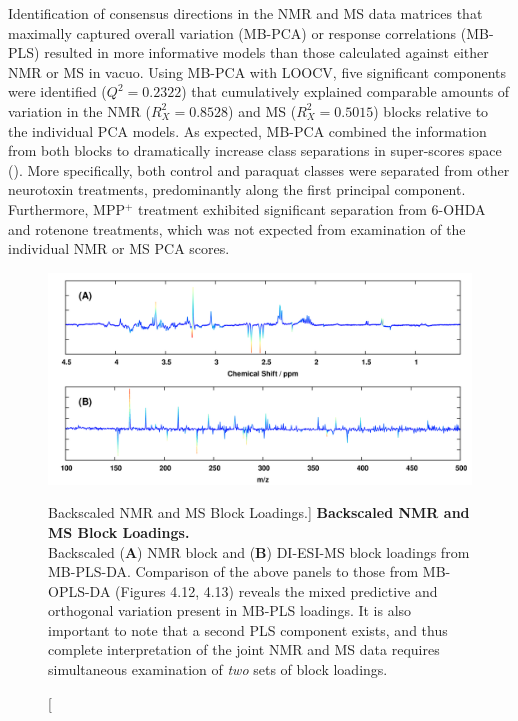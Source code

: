 \begin{doublespace}
Identification of consensus directions in the NMR and MS data matrices that
maximally captured overall variation (MB-PCA) or response correlations (MB-PLS)
resulted in more informative models than those calculated against either NMR
or MS in vacuo. Using MB-PCA with LOOCV, five significant components were
identified ($Q^2 = 0.2322$) that cumulatively explained comparable amounts
of variation in the NMR ($R^2_X = 0.8528$) and MS ($R^2_X = 0.5015$) blocks
relative to the individual PCA models. As expected, MB-PCA combined the
information from both blocks to dramatically increase class separations in
super-scores space (). More specifically, both
control and paraquat classes were separated from other neurotoxin treatments,
predominantly along the first principal component. Furthermore, MPP$^+$
treatment exhibited significant separation from 6-OHDA and rotenone
treatments, which was not expected from examination of the individual
NMR or MS PCA scores.
\end{doublespace}

\begin{figure}[ht!]
\includegraphics[width=6in]{figs/apps/11-mbpls-p.png}
\caption
      [Backscaled NMR and MS Block Loadings.]{
  {\bf Backscaled NMR and MS Block Loadings.}
  \\
  Backscaled ({\bf A}) \hnmr{} NMR block and ({\bf B}) DI-ESI-MS block loadings
  from MB-PLS-DA. Comparison of the above panels to those from MB-OPLS-DA
  (Figures 4.12, 4.13) reveals the mixed predictive and orthogonal variation
  present in MB-PLS loadings. It is also important to note that a second
  PLS component exists, and thus complete interpretation of the joint NMR
  and MS data requires simultaneous examination of \emph{two} sets of
  block loadings.
}
\label{figure.4.11}
\end{figure}

